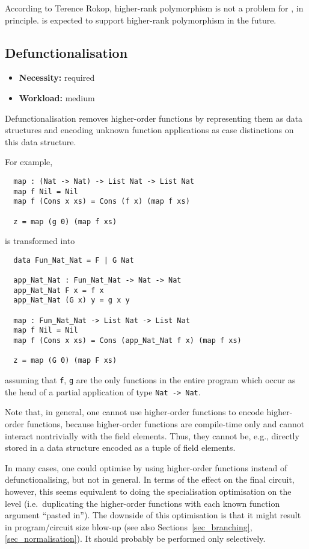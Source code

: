 \documentclass[
    9pt,            %
    techreport,        %
    affiltop,       %
]{art}
\begin{document}
According to Terence Rokop, higher-rank polymorphism is not a problem
for \Geb{}, in principle. \Geb{} is expected to support
higher-rank polymorphism in the future.

\subsection{Defunctionalisation}\label{sec_defunctionalisation}

\begin{itemize}
\item {\bf Necessity:} required
\item {\bf Workload:} medium
\end{itemize}

\noindent Defunctionalisation removes higher-order functions by
representing them as data structures and encoding unknown function
applications as case distinctions on this data structure.

\medskip

\noindent For example,
\begin{verbatim}
  map : (Nat -> Nat) -> List Nat -> List Nat
  map f Nil = Nil
  map f (Cons x xs) = Cons (f x) (map f xs)

  z = map (g 0) (map f xs)
\end{verbatim}
is transformed into
\begin{verbatim}
  data Fun_Nat_Nat = F | G Nat

  app_Nat_Nat : Fun_Nat_Nat -> Nat -> Nat
  app_Nat_Nat F x = f x
  app_Nat_Nat (G x) y = g x y

  map : Fun_Nat_Nat -> List Nat -> List Nat
  map f Nil = Nil
  map f (Cons x xs) = Cons (app_Nat_Nat f x) (map f xs)

  z = map (G 0) (map F xs)
\end{verbatim}
assuming that \texttt{f}, \texttt{g} are the only functions in the
entire program which occur as the head of a partial application of
type \texttt{Nat -> Nat}.

Note that, in general, one cannot use \VampIR{} higher-order functions to
encode \Juvix{} higher-order functions, because \VampIR{} higher-order
functions are compile-time only and cannot interact nontrivially
with the field elements. Thus, they cannot be, e.g., directly stored in
a data structure encoded as a tuple of field elements.

In many cases, one could optimise by using \VampIR{} higher-order
functions instead of defunctionalising, but not in general. In terms
of the effect on the final circuit, however, this seems equivalent to
doing the specialisation optimisation on the \JuvixCore{} level
(i.e.~duplicating the higher-order functions with each known function
argument ``pasted in''). The downside of this optimisation is that it
might result in program/circuit size blow-up (see also
Sections~\ref{sec_branching},\ref{sec_normalisation}). It should
probably be performed only selectively.
\end{document}
